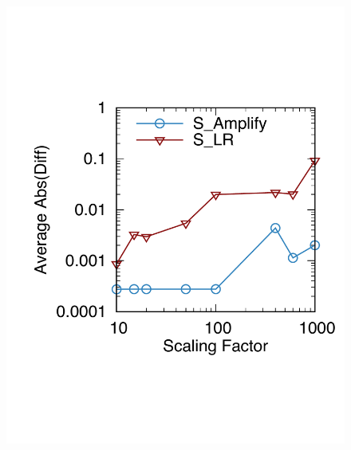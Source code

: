 \begin{figure}[ht]
\begin{minipage}{.31\textwidth}
		\label{fig:trainingTime}
	\end{minipage}%
	\begin{minipage}{.38\textwidth}
		\captionsetup{justification=centering,margin=0.1cm}
		\centering
		\includegraphics[width=.8\linewidth]{Graph/negSamp/AmplifyLRTheoryL1New.pdf}

		\label{fig:amplifyLR}
	\end{minipage}%

\end{figure}




